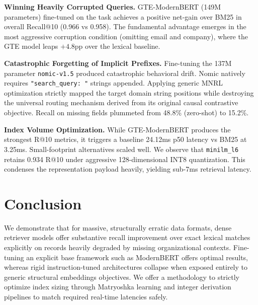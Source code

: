 \documentclass{article}
\begin{document}
\textbf{Winning Heavily Corrupted Queries.}
GTE-ModernBERT (149M parameters) fine-tuned on the task achieves a positive net-gain over BM25 in overall Recall@10 (0.966 vs 0.958). The fundamental advantage emerges in the most aggressive corruption condition (omitting email and company), where the GTE model leaps $+4.8$pp over the lexical baseline. 

\textbf{Catastrophic Forgetting of Implicit Prefixes.}
Fine-tuning the 137M parameter \texttt{nomic-v1.5} produced catastrophic behavioral drift. Nomic natively requires \texttt{"search\_query: "} strings appended. Applying generic MNRL optimization strictly mapped the target domain string positions while destroying the universal routing mechanism derived from its original causal contrastive objective. Recall on missing fields plummeted from 48.8\% (zero-shot) to 15.2\%.

\textbf{Index Volume Optimization.}
While GTE-ModernBERT produces the strongest R@10 metrics, it triggers a baseline 24.12ms p50 latency vs BM25 at 3.25ms. Small-footprint alternatives scaled well. We observe that \texttt{minilm\_l6} retains 0.934 R@10 under aggressive 128-dimensional INT8 quantization. This condenses the representation payload heavily, yielding sub-7ms retrieval latency.

\section{Conclusion}

We demonstrate that for massive, structurally erratic data formats, dense retriever models offer substantive recall improvement over exact lexical matches explicitly on records heavily degraded by missing organizational contexts. Fine-tuning an explicit base framework such as ModernBERT offers optimal results, whereas rigid instruction-tuned architectures collapse when exposed entirely to generic structural embeddings objectives. We offer a methodology to strictly optimize index sizing through Matryoshka learning and integer derivation pipelines to match required real-time latencies safely. 



\end{document}
